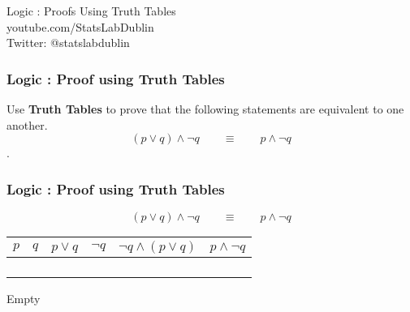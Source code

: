 \documentclass[Logic-MASTER.tex]{subfiles}
\begin{document}
\begin{frame}
\begin{center}
{ \Huge
Logic : Proofs Using Truth Tables }
\\
\bigskip
{ \Large
youtube.com/StatsLabDublin \\ \vspace{0.2cm} Twitter: @statslabdublin
}
\end{center}
\end{frame}

\begin{frame}
\frametitle{Logic :  Proof using Truth Tables}
\Large
\vspace{-1.0cm}
Use \textbf{Truth Tables} to prove that the following statements are equivalent to one another.
\[(p \vee q) \wedge \neg q \qquad \equiv \qquad  p\wedge \neg q\].
\end{frame}


\begin{frame}
\frametitle{Logic :  Proof using Truth Tables}
\LARGE
\vspace{-1.8cm}
\[(p \vee q) \wedge \neg q \qquad \equiv \qquad  p\wedge \neg q\]
\bigskip
\begin{tabular}{|c|c||c|c|c||c|}
\hline $p$ & $q$ & $p \vee q$ & $\neg q$ & $\neg q \wedge (p \vee q)$ & $p\wedge \neg q$ \\ 
\hline  &  &  &  &  &  \\ 
\hline  &  &  &  &  &  \\ 
\hline  &  &  &  &  &  \\ 
\hline  &  &  &  &  &  \\ 
\hline 
\end{tabular} 
\end{frame}

\begin{frame}
Empty
\end{frame}
\end{document}
